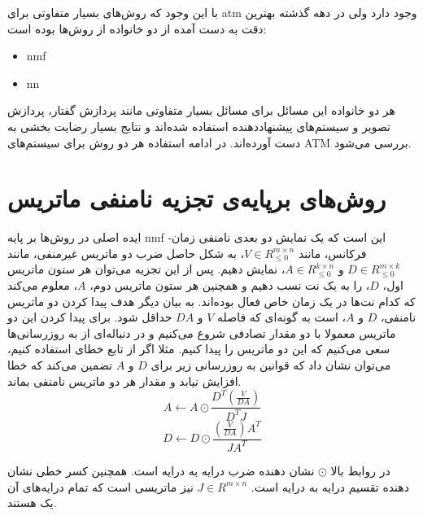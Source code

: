با این وجود که روش‌های بسیار متفاوتی برای \gls{atm} وجود دارد ولی در دهه گذشته
بهترین دقت به دست آمده از دو خانواده از روش‌ها بوده است:
\begin{itemize}
    \item \gls{nmf}
    \item \gls{nn}
\end{itemize}
هر دو خانواده این مسائل برای مسائل بسیار متفاوتی مانند پردازش گفتار، پردازش
تصویر و سیستم‌های پیشنهاددهنده استفاده شده‌اند و نتایج بسیار رضایت بخشی به دست
آورده‌اند. در ادامه استفاده هر دو روش برای سیستم‌های \gls{ATM} بررسی می‌شود.

\section{روش‌های برپایه‌ی تجزیه نامنفی ماتریس}
ایده اصلی در روش‌ها بر پایه \gls{nmf} این است که یک نمایش دو بعدی نامنفی
زمان-فرکانس، مانند $V \in R_{\leq 0}^{m \times n}$، به شکل حاصل ضرب دو ماتریس
غیرمنفی، مانند $D \in R_{\leq 0}^{m \times k}$ و $A \in R_{\leq 0}^{k \times
n}$، نمایش دهیم. پس از این تجزیه می‌توان هر ستون ماتریس اول، $D$، را به یک نت نسب
دهیم و همچنین هر ستون ماتریس دوم، $A$، معلوم می‌کند که کدام نت‌ها در یک زمان خاص
فعال بوده‌اند. به بیان دیگر هدف پیدا کردن دو ماتریس نامنفی، $D$ و $A$، است به
گونه‌ای که فاصله $V$ و $DA$ حداقل شود. برای پیدا کردن این دو ماتریس معمولا با دو
مقدار تصادفی شروع می‌کنیم و در دنباله‌ای از به روزرسانی‌ها سعی می‌کنیم که این دو
ماتریس را پیدا کنیم. مثلا اگر از تابع خطای  استفاده کنیم،
می‌توان نشان داد که قوانین به روزرسانی زیر برای $D$ و $A$ تضمین می‌کند که خطا
افزایش نیابد و مقدار هر دو ماتریس نامنفی بماند.
\begin{equation}
    A \leftarrow A \odot \frac{D^T(\frac{V}{DA})}{D^T J}
\end{equation}
\begin{equation}
    D \leftarrow D \odot \frac{(\frac{V}{DA})A^T}{J A^T}
\end{equation}

در روابط بالا $\odot$ نشان دهنده ضرب درایه به درایه است. همچنین کسر خطی نشان
دهنده تقسیم درایه به درایه است. $J \in R^{m \times n}$ نیز ماتریسی است که تمام
درایه‌های آن یک هستند.

